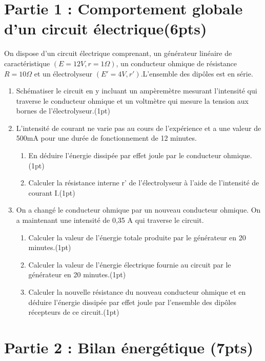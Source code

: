 \documentclass[12pt]{article}
\begin{document}
 \section*{Partie 1 :  Comportement globale d’un circuit électrique\dotfill(6pts)}
 On dispose d’un circuit électrique comprenant, un générateur linéaire de caractéristique $(E = 12V , r = 1\Omega )$, un conducteur ohmique de résistance $R = 10\Omega$ et un électrolyseur $(E' = 4V, r')$.L’ensemble des dipôles est en série.
\begin{enumerate}
  \item Schématiser le circuit en y incluant un ampèremètre mesurant l’intensité qui traverse le conducteur
    ohmique et un voltmètre qui mesure la tension aux bornes de l’électrolyseur.\dotfill(1pt)
  \item L’intensité de courant ne varie pas au cours de l’expérience et a une valeur de 500mA pour une
    durée de fonctionnement de 12 minutes.
    \begin{enumerate}
      \item En déduire l’énergie dissipée par effet joule par le conducteur ohmique.\dotfill(1pt)
      \item Calculer la résistance interne r' de l’électrolyseur à l’aide de l’intensité de courant I.\dotfill(1pt)
    \end{enumerate}
    \item On a changé le conducteur ohmique par un nouveau conducteur ohmique. On a maintenant une intensité de 0,35 A qui traverse le circuit.
    \begin{enumerate}
      \item Calculer la valeur de l’énergie totale produite par le générateur en 20 minutes.\dotfill(1pt)
      \item Calculer la valeur de l’énergie électrique fournie au circuit par le générateur en 20 minutes.\dotfill(1pt)
        \item Calculer la nouvelle résistance du nouveau conducteur ohmique et en déduire l’énergie dissipée
          par effet joule par l’ensemble des dipôles récepteurs de ce circuit.\dotfill(1pt)
    \end{enumerate}
\end{enumerate}

 \section*{Partie 2 : Bilan énergétique \dotfill(7pts)}
\end{document}

